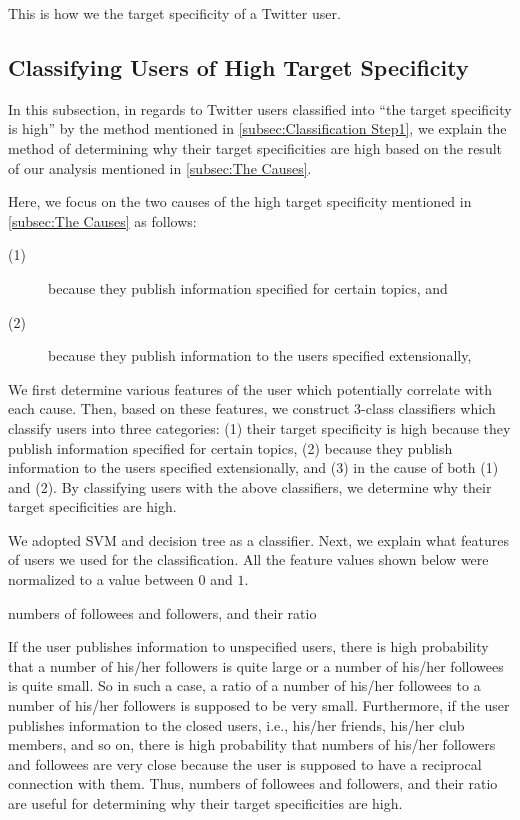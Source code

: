 This is how we the target specificity of a Twitter user.

\subsection{Classifying Users of High Target Specificity}
\label{subsec:Classification Step2}

In this subsection, in regards to Twitter users classified into ``the
target specificity is high'' by the method mentioned in
\ref{subsec:Classification Step1}, we explain the method of determining
why their target specificities are high based on the result of our
analysis mentioned in \ref{subsec:The Causes}.

Here, we focus on the two causes of the high target specificity
mentioned in \ref{subsec:The Causes} as follows:
\begin{description}
 \item[(1)] because they publish information specified for certain
            topics, and
 \item[(2)] because they publish information to the users specified
            extensionally,
\end{description}


We first determine various features of the user which potentially
correlate with each cause.  Then, based on these features, we construct
3-class classifiers which classify users into three categories: (1)
their target specificity is high because they publish information
specified for certain topics, (2) because they publish information to
the users specified extensionally, and (3) in the cause of both (1) and
(2).  By classifying users with the above classifiers, we determine why
their target specificities are high.

We adopted SVM and decision tree as a classifier.  Next, we explain what
features of users we used for the classification.  All the feature
values shown below were normalized to a value between $0$ and $1$.

\begin{description}
\bf {\item[(i)] numbers of followees and followers, and their ratio}
\end{description}

If the user publishes information to unspecified users, there is high
probability that a number of his/her followers is quite large or a
number of his/her followees is quite small.  So in such a case, a ratio
of a number of his/her followees to a number of his/her followers is
supposed to be very small.  Furthermore, if the user publishes
information to the closed users, i.e., his/her friends, his/her club
members, and so on, there is high probability that numbers of his/her
followers and followees are very close because the user is supposed to
have a reciprocal connection with them.  Thus, numbers of followees and
followers, and their ratio are useful for determining why their target
specificities are high.


